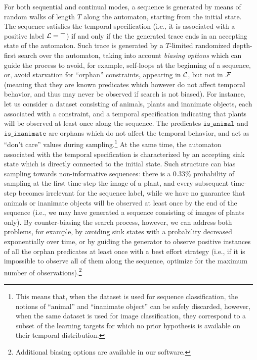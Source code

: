 For both sequential and continual modes, a sequence is generated by means of random walks of length $T$ along the automaton, starting from the initial state. The sequence satisfies the temporal specification (i.e., it is associated with a positive label ${\mathcal{L}} = \top$) if and only if the the generated trace ends in an accepting state of the automaton.
Such trace is generated by a $T$-limited randomized depth-first search over the automaton, taking into account \textit{biasing options} which can guide the process to avoid, for example, self-loops at the beginning of a sequence, or, avoid starvation for ``orphan'' constraints, appearing in ${\mathcal{C}}$, but not in ${\mathcal{F}}$ (meaning that they are known predicates which however do not affect temporal behavior, and thus may never be observed if search is not biased).
For instance, let us consider a dataset consisting of animals, plants and inanimate objects, each associated with a constraint, and a temporal specification indicating that plants will be observed at least once along the sequence. The predicates $\texttt{is\_animal}$ and $\texttt{is\_inanimate}$ are orphans which do not affect the temporal behavior, and act as ``don't care'' values during sampling.\footnote{This means that, when the dataset is used for sequence classification, the notions of ``animal'' and ``inanimate object'' can be safely discarded, however, when the same dataset is used for image classification, they correspond to a subset of the learning targets for which no prior hypothesis is available on their temporal distribution.} At the same time, the automaton associated with the temporal specification is characterized by an accepting sink state which is directly connected to the initial state. Such structure can bias sampling towards non-informative sequences: there is a $0.33\%$ probability of sampling at the first time-step the image of a plant, and every subsequent time-step becomes irrelevant for the sequence label, while we have no guarantee that animals or inanimate objects will be observed at least once by the end of the sequence (i.e., we may have generated a sequence consisting of images of plants only). By counter-biasing the search process, however, we can address both problems, for example, by avoiding sink states with a probability decreased exponentially over time, or by guiding the generator to observe positive instances of all the orphan predicates at least once with a best effort strategy (i.e., if it is impossible to observe all of them along the sequence, optimize for the maximum number of observations).\footnote{Additional biasing options are available in our software.}

